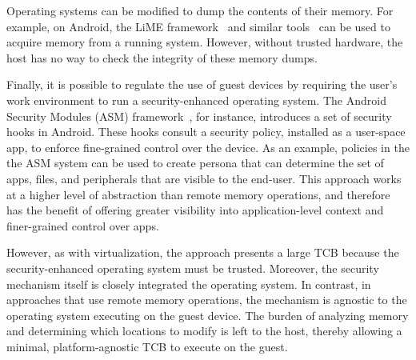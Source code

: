 %
Operating systems can be modified to dump the contents of their memory. For
example, on Android, the LiME framework~\cite{lime} and similar
tools~\cite{dmd,ddms,recoverymode} can be used to acquire memory from a running
system. However, without trusted hardware, the host has no way to check the
integrity of these memory dumps.

Finally, it is possible to regulate the use of guest devices by requiring the
user's work environment to run a security-enhanced operating system. The
Android Security Modules (ASM) framework~\cite{asm:sec14}, for instance,
introduces a set of security hooks in Android.  These hooks consult a security
policy, installed as a user-space app, to enforce fine-grained control over the
device. As an example, policies in the the ASM system can be used to create
persona that can determine the set of apps, files, and peripherals that are
visible to the end-user. This approach works at a higher level of abstraction
than remote memory operations, and therefore has the benefit of offering
greater visibility into application-level context and finer-grained control
over apps.

However, as with virtualization, the approach presents a large TCB because the
security-enhanced operating system must be trusted. Moreover, the security
mechanism itself is closely integrated the operating system. In contrast, in
approaches that use remote memory operations, the mechanism is agnostic to
the operating system executing on the guest device. The burden of analyzing
memory and determining which locations to modify is left to the host, thereby
allowing a minimal, platform-agnostic TCB to execute on the guest.




